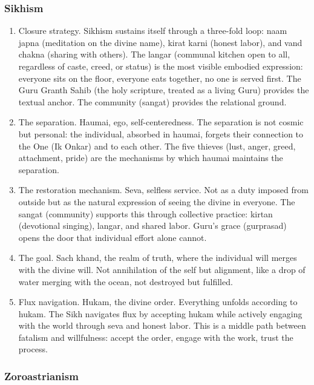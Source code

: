 \documentclass[
]{article}
\providecommand{\tightlist}{%
  \setlength{\itemsep}{0pt}\setlength{\parskip}{0pt}}
\begin{document}
\subsubsection{Sikhism}\label{sikhism}

\begin{enumerate}
\def\labelenumi{\arabic{enumi}.}
\setcounter{enumi}{65}
\tightlist
\item
  Closure strategy. Sikhism sustains itself through a three-fold loop:
  naam japna (meditation on the divine name), kirat karni (honest
  labor), and vand chakna (sharing with others). The langar (communal
  kitchen open to all, regardless of caste, creed, or status) is the
  most visible embodied expression: everyone sits on the floor, everyone
  eats together, no one is served first. The Guru Granth Sahib (the holy
  scripture, treated as a living Guru) provides the textual anchor. The
  community (sangat) provides the relational ground.
\item
  The separation. Haumai, ego, self-centeredness. The separation is not
  cosmic but personal: the individual, absorbed in haumai, forgets their
  connection to the One (Ik Onkar) and to each other. The five thieves
  (lust, anger, greed, attachment, pride) are the mechanisms by which
  haumai maintains the separation.
\item
  The restoration mechanism. Seva, selfless service. Not as a duty
  imposed from outside but as the natural expression of seeing the
  divine in everyone. The sangat (community) supports this through
  collective practice: kirtan (devotional singing), langar, and shared
  labor. Guru's grace (gurprasad) opens the door that individual effort
  alone cannot.
\item
  The goal. Sach khand, the realm of truth, where the individual will
  merges with the divine will. Not annihilation of the self but
  alignment, like a drop of water merging with the ocean, not destroyed
  but fulfilled.
\item
  Flux navigation. Hukam, the divine order. Everything unfolds according
  to hukam. The Sikh navigates flux by accepting hukam while actively
  engaging with the world through seva and honest labor. This is a
  middle path between fatalism and willfulness: accept the order, engage
  with the work, trust the process.
\end{enumerate}

\subsubsection{Zoroastrianism}\label{zoroastrianism}
\end{document}
